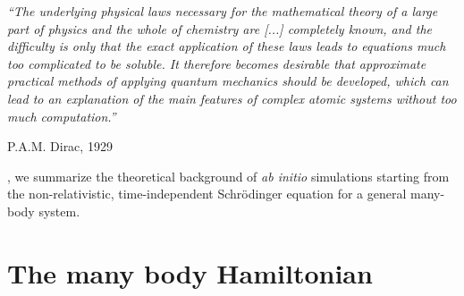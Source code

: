 \epigraph{\singlespacing \it ``The underlying physical laws necessary
for the mathematical theory of a large part of physics and the whole of chemistry
are [...] completely known, and the difficulty is only that the exact application
of these laws leads to equations much too complicated to be soluble. It therefore becomes desirable that approximate practical methods of applying quantum
mechanics should be developed, which can lead to an explanation of the main
features of complex atomic systems without too much computation.''}{P.A.M. Dirac, 1929~\cite{Dirac.1929}}

, we summarize the theoretical background of {\it ab initio} simulations starting from the non-relativistic, time-independent Schrödinger equation for a general many-body system.

\section{The many body Hamiltonian}

